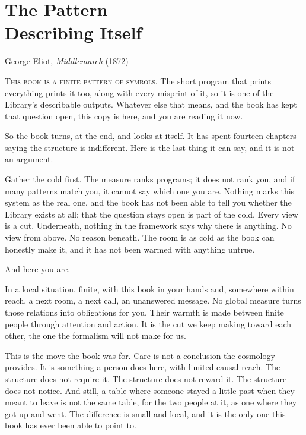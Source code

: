 \chapter[The Pattern Describing Itself]{The Pattern\\Describing Itself}

{George Eliot, \textit{Middlemarch} (1872)}

\noindent \textsc{This book is a finite pattern of symbols.} The short program that prints everything prints it too, along with every misprint of it, so it is one of the Library's describable outputs. Whatever else that means, and the book has kept that question open, this copy is here, and you are reading it now.

So the book turns, at the end, and looks at itself. It has spent fourteen chapters saying the structure is indifferent. Here is the last thing it can say, and it is not an argument.

Gather the cold first. The measure ranks programs; it does not rank you, and if many patterns match you, it cannot say which one you are. Nothing marks this system as the real one, and the book has not been able to tell you whether the Library exists at all; that the question stays open is part of the cold. Every view is a cut. Underneath, nothing in the framework says why there is anything. No view from above. No reason beneath. The room is as cold as the book can honestly make it, and it has not been warmed with anything untrue.

And here you are.

In a local situation, finite, with this book in your hands and, somewhere within reach, a next room, a next call, an unanswered message. No global measure turns those relations into obligations for you. Their warmth is made between finite people through attention and action. It is the cut we keep making toward each other, the one the formalism will not make for us.

This is the move the book was for. Care is not a conclusion the cosmology provides. It is something a person does here, with limited causal reach. The structure does not require it. The structure does not reward it. The structure does not notice. And still, a table where someone stayed a little past when they meant to leave is not the same table, for the two people at it, as one where they got up and went. The difference is small and local, and it is the only one this book has ever been able to point to.


